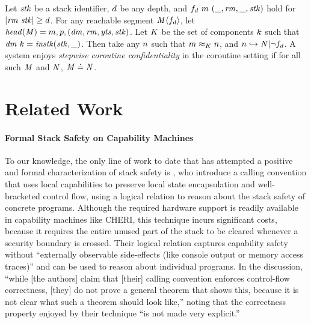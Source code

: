 \documentclass[acmsmall,review,anonymous]{acmart}\settopmatter{printfolios=true,printccs=false,printacmref=false}
\begin{document}
 Let \(\mathit{stk}\) be a stack identifier, \(d\) be any depth, and
\(f_d ~ m ~ (\_, \mathit{rm}, \_, \mathit{stk})\) hold for \(|\mathit{rm} ~ \mathit{stk}| \geq d\).
For any reachable segment \(\mathit{M} \langle f_d \rangle\),
let \(\mathit{head}(\mathit{M}) = m,p,(\mathit{dm},\mathit{rm},\mathit{yts},\mathit{stk})\). Let
\(K\) be the set of components \(k\) such that
\(\mathit{dm} ~ k = \mathit{instk}(\mathit{stk},\_)\).
Then take any \(n\) such that \(m \approx_K n\), and
\(n \hookrightarrow \mathit{N} | \neg f_d\). A system enjoys
{\em stepwise coroutine confidentiality} in the coroutine setting if for all
such \(\mathit{M}\) and \(\mathit{N}\), \(\mathit{M} \doteq \mathit{N}\).

\section{Related Work}
\label{sec:relwork}


\paragraph{Formal Stack Safety on Capability Machines}
%
To our knowledge, the only line of work to date that has attempted
a positive and formal characterization of
stack safety is \citet{Skorstengaard+19b}, who introduce a calling
convention that uses local capabilities to preserve local state
encapsulation and well-bracketed control flow, using a logical
relation to reason about the stack safety of concrete
programs. Although the required hardware support is readily available
in capability machines like CHERI, this technique incurs significant
costs, because it requires the entire unused part of the stack to be
cleared whenever a security boundary is crossed. Their logical
relation captures capability safety without ``externally observable
side-effects (like console output or memory access traces)''
and can be used to reason about individual programs. In the
discussion, ``while [the authors] claim that [their] calling
convention enforces control-flow correctness, [they] do not prove a
general theorem that shows this, because it is not clear what such a
theorem should look like,'' noting that the correctness property
enjoyed by their technique ``is not made very explicit.''
\end{document}
